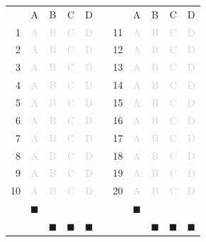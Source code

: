 \documentclass[a4paper,11pt]{article}
\newcommand{\light}[1]{\textcolor{lightgray}{#1}}
\begin{document}
\begin{center}
\large
\begin{tabular}{r|c|c|c|c|p{0.3cm}r|c|c|c|c|}
\multicolumn{1}{c}{} &
\multicolumn{1}{c}{A}&
\multicolumn{1}{c}{B}&
\multicolumn{1}{c}{C}&
\multicolumn{1}{c}{D}& \multicolumn{2}{c}{} &
\multicolumn{1}{c}{A}&
\multicolumn{1}{c}{B}&
\multicolumn{1}{c}{C}&
\multicolumn{1}{c}{D}\\ 
\cline{2-5} \cline{8-11}
1& \light{A} & \light{B} & \light{C} & \light{D} & & 11& \light{A} & \light{B} & \light{C} & \light{D} \\ 
\cline{2-5} \cline{8-11}
2& \light{A} & \light{B} & \light{C} & \light{D} & & 12& \light{A} & \light{B} & \light{C} & \light{D} \\ 
\cline{2-5} \cline{8-11}
3& \light{A} & \light{B} & \light{C} & \light{D} & & 13& \light{A} & \light{B} & \light{C} & \light{D} \\ 
\cline{2-5} \cline{8-11}
4& \light{A} & \light{B} & \light{C} & \light{D} & & 14& \light{A} & \light{B} & \light{C} & \light{D} \\ 
\cline{2-5} \cline{8-11}
5& \light{A} & \light{B} & \light{C} & \light{D} & & 15& \light{A} & \light{B} & \light{C} & \light{D} \\ 
\cline{2-5} \cline{8-11}
6& \light{A} & \light{B} & \light{C} & \light{D} & & 16& \light{A} & \light{B} & \light{C} & \light{D} \\ 
\cline{2-5} \cline{8-11}
7& \light{A} & \light{B} & \light{C} & \light{D} & & 17& \light{A} & \light{B} & \light{C} & \light{D} \\ 
\cline{2-5} \cline{8-11}
8& \light{A} & \light{B} & \light{C} & \light{D} & & 18& \light{A} & \light{B} & \light{C} & \light{D} \\ 
\cline{2-5} \cline{8-11}
9& \light{A} & \light{B} & \light{C} & \light{D} & & 19& \light{A} & \light{B} & \light{C} & \light{D} \\ 
\cline{2-5} \cline{8-11}
10& \light{A} & \light{B} & \light{C} & \light{D} & & 20& \light{A} & \light{B} & \light{C} & \light{D} \\ 
\cline{2-5} \cline{8-11}
\multicolumn{1}{c}{} & \multicolumn{1}{c}{$\blacksquare$} & \multicolumn{1}{c}{} & \multicolumn{1}{c}{} & \multicolumn{1}{c}{} & \multicolumn{2}{c}{} & \multicolumn{1}{c}{$\blacksquare$} & \multicolumn{1}{c}{} & \multicolumn{1}{c}{} & \multicolumn{1}{c}{}\\ 
\multicolumn{1}{c}{} & \multicolumn{1}{c}{} & \multicolumn{1}{c}{$\blacksquare$} & \multicolumn{1}{c}{$\blacksquare$} & \multicolumn{1}{c}{$\blacksquare$} & \multicolumn{2}{c}{} & \multicolumn{1}{c}{} & \multicolumn{1}{c}{$\blacksquare$} & \multicolumn{1}{c}{$\blacksquare$} & \multicolumn{1}{c}{$\blacksquare$}\\ 
\end{tabular}
\end{center}
\end{document}
